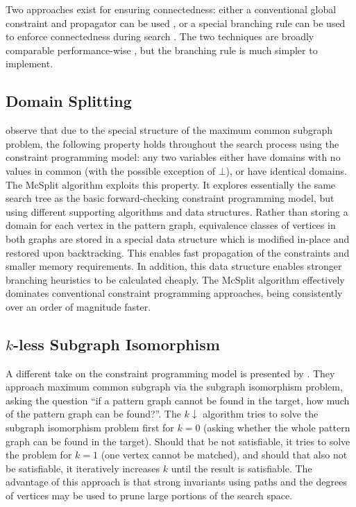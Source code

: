 \documentclass[sigconf]{acmart}
\begin{document}
Two approaches exist for ensuring connectedness: either a conventional global constraint and
propagator can be used \citep{DBLP:conf/cp/McCreeshNPS16}, or a special branching rule can be used
to enforce connectedness during search \citep{DBLP:conf/mco/VismaraV08}. The two techniques are
broadly comparable performance-wise \citep{DBLP:conf/cp/McCreeshNPS16}, but the branching rule is
much simpler to implement.

\subsection{Domain Splitting}

\citet{o:McCreeshPT17} observe that due to the special structure of the maximum common subgraph
problem, the following property holds throughout the search process using the constraint programming
model: any two variables either have domains with no values in common (with the possible exception
of $\bot$), or have identical domains. The McSplit algorithm exploits this property. It explores
essentially the same search tree as the basic forward-checking constraint programming model, but
using different supporting algorithms and data structures.  Rather than storing a domain for each
vertex in the pattern graph, equivalence classes of vertices in both graphs are stored in a special
data structure which is modified in-place and restored upon backtracking. This enables fast
propagation of the constraints and smaller memory requirements. In addition, this data structure
enables stronger branching heuristics to be calculated cheaply. The McSplit algorithm effectively
dominates conventional constraint programming approaches, being consistently over an order of
magnitude faster.

\subsection{$k$-less Subgraph Isomorphism}

A different take on the constraint programming model is presented by
\citet{DBLP:conf/aaai/HoffmannMR17}. They approach maximum common subgraph via the
subgraph isomorphism problem, asking the question ``if a pattern graph cannot be found in the
target, how much of the pattern graph can be found?''. The $k{\downarrow}$ algorithm tries to solve
the subgraph isomorphism problem first for $k=0$ (asking whether the whole pattern graph can be found in the
target). Should that be not satisfiable, it tries to solve the problem for $k=1$ (one vertex cannot
be matched), and should that also not be satisfiable, it iteratively increases $k$ until the result
is satisfiable. The advantage of this approach is that strong invariants using paths and the degrees
of vertices may be used to prune large portions of the search space.
\end{document}

